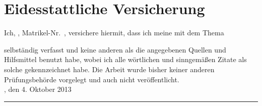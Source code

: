 
\chapter*{Eidesstattliche Versicherung}

\thispagestyle{empty}

Ich, \autor, Matrikel-Nr.\ \matrikelnr, versichere hiermit, dass ich meine \art\xspace mit dem Thema

\begin{quote}
\textit{\titel} \textit{\untertitel}
\end{quote}

selbständig verfasst und keine anderen als die angegebenen Quellen und Hilfsmittel benutzt habe, wobei ich alle wörtlichen und sinngemäßen Zitate als solche gekennzeichnet habe. Die Arbeit wurde bisher keiner anderen Prüfungsbehörde vorgelegt und auch nicht veröffentlicht. \\[6ex]

\ort, den 4. Oktober 2013\\[3ex]


\rule[-0.2cm]{5cm}{0.5pt}

\textsc{\autor} 
